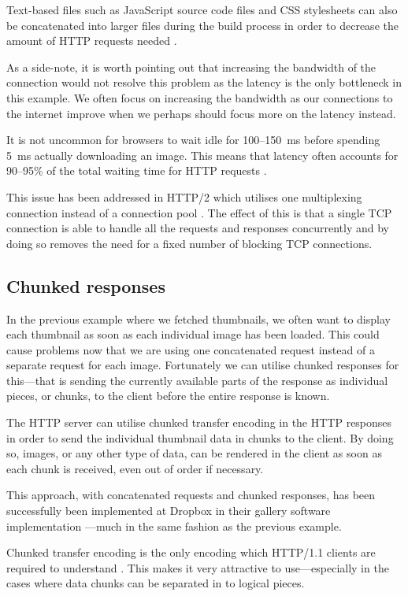 \documentclass{cslthse-msc}
\begin{document}
Text-based files such as JavaScript source code files and CSS stylesheets can also be concatenated into larger files during the build process in order to decrease the amount of HTTP requests needed \cite{css_sprites}.

As a side-note, it is worth pointing out that increasing the bandwidth of the connection would not resolve this problem as the latency is the only bottleneck in this example. We often focus on increasing the bandwidth as our connections to the internet improve when we perhaps should focus more on the latency instead.

It is not uncommon for browsers to wait idle for 100--150~ms before spending 5~ms actually downloading an image. This means that latency often accounts for 90--95\% of the total waiting time for HTTP requests \cite{latency}.

This issue has been addressed in HTTP/2 which utilises one multiplexing connection instead of a connection pool \cite{rfc_7540}. The effect of this is that a single TCP connection is able to handle all the requests and responses concurrently and by doing so removes the need for a fixed number of blocking TCP connections.

\subsection{Chunked responses}
In the previous example where we fetched thumbnails, we often want to display each thumbnail as soon as each individual image has been loaded. This could cause problems now that we are using one concatenated request instead of a separate request for each image. Fortunately we can utilise chunked responses \cite{chunked} for this---that is sending the currently available parts of the response as individual pieces, or chunks, to the client before the entire response is known.

The HTTP server can utilise chunked transfer encoding in the HTTP responses in order to send the individual thumbnail data in chunks to the client. By doing so, images, or any other type of data, can be rendered in the client as soon as each chunk is received, even out of order if necessary. 

This approach, with concatenated requests and chunked responses, has been successfully been implemented at Dropbox in their gallery software implementation \cite{dropbox_chunked}---much in the same fashion as the previous example.

Chunked transfer encoding is the only encoding which HTTP/1.1 clients are required to understand \cite{rfc2616}. This makes it very attractive to use---especially in the cases where data chunks can be separated in to logical pieces.
\end{document}

